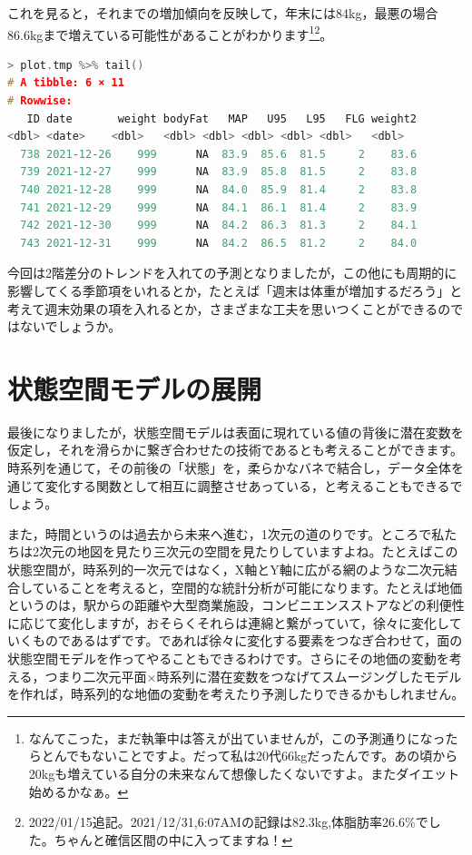 \documentclass{ltjsbook}
\begin{document}
これを見ると，それまでの増加傾向を反映して，年末には84kg，最悪の場合86.6kgまで増えている可能性があることがわかります\footnote{なんてこった，まだ執筆中は答えが出ていませんが，この予測通りになったらとんでもないことですよ。だって私は20代66kgだったんです。あの頃から20kgも増えている自分の未来なんて想像したくないですよ。またダイエット始めるかなぁ。}\footnote{2022/01/15追記。2021/12/31,6:07AMの記録は82.3kg,体脂肪率26.6\%でした。ちゃんと確信区間の中に入ってますね！}。

\begin{lstlisting}[language=c++,label={code:16_10},caption={2階差分トレンドで予想される2021年末の体重(一部略)}]
> plot.tmp %>% tail()
# A tibble: 6 × 11
# Rowwise: 
   ID date       weight bodyFat   MAP   U95   L95   FLG weight2
<dbl> <date>    <dbl>   <dbl> <dbl> <dbl> <dbl> <dbl>   <dbl>
  738 2021-12-26    999      NA  83.9  85.6  81.5     2    83.6
  739 2021-12-27    999      NA  83.9  85.8  81.5     2    83.8
  740 2021-12-28    999      NA  84.0  85.9  81.4     2    83.8
  741 2021-12-29    999      NA  84.1  86.1  81.4     2    83.9
  742 2021-12-30    999      NA  84.2  86.3  81.3     2    84.1
  743 2021-12-31    999      NA  84.2  86.5  81.2     2    84.0
\end{lstlisting}

今回は2階差分のトレンドを入れての予測となりましたが，この他にも周期的に影響してくる季節項をいれるとか，たとえば「週末は体重が増加するだろう」と考えて週末効果の項を入れるとか，さまざまな工夫を思いつくことができるのではないでしょうか。

\section{状態空間モデルの展開}
最後になりましたが，状態空間モデルは表面に現れている値の背後に潜在変数を仮定し，それを滑らかに繋ぎ合わせたの技術であるとも考えることができます。時系列を通じて，その前後の「状態」を，柔らかなバネで結合し，データ全体を通じて変化する関数として相互に調整させあっている，と考えることもできるでしょう。

また，時間というのは過去から未来へ進む，1次元の道のりです。ところで私たちは2次元の地図を見たり三次元の空間を見たりしていますよね。たとえばこの状態空間が，時系列的一次元ではなく，X軸とY軸に広がる網のような二次元結合していることを考えると，空間的な統計分析が可能になります。たとえば地価というのは，駅からの距離や大型商業施設，コンビニエンスストアなどの利便性に応じて変化しますが，おそらくそれらは連綿と繋がっていて，徐々に変化していくものであるはずです。であれば徐々に変化する要素をつなぎ合わせて，面の状態空間モデルを作ってやることもできるわけです。さらにその地価の変動を考える，つまり二次元平面$\times$時系列に潜在変数をつなげてスムージングしたモデルを作れば，時系列的な地価の変動を考えたり予測したりできるかもしれません。
\end{document}

